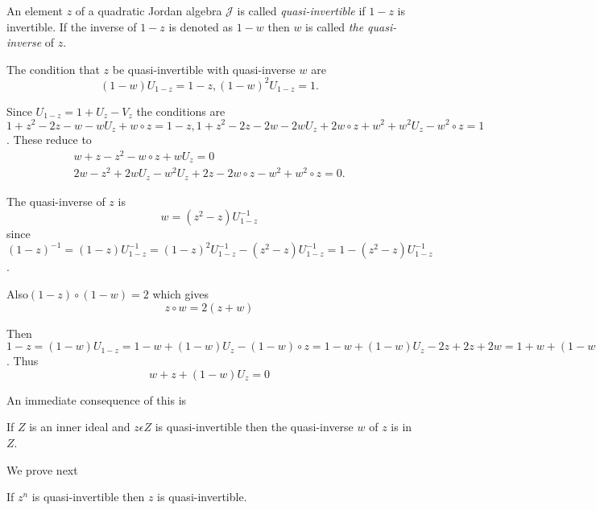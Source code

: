 \setcounter{defn}{0}
\begin{defn}\label{c3:defn1}
An element $z$ of a quadratic Jordan algebra $\mathscr{J}$ is called
{\em quasi-invertible} if $1-z$ is invertible. If the inverse of $1-z$
is denoted as $1-w$ then $w$ is called {\em the quasi-inverse} of $z$.

The condition that $z$ be quasi-invertible with quasi-inverse $w$ are
\begin{equation*}
(1-w)U_{1-z}=1-z,(1-w)^{2}U_{1-z}=1.\tag{1}\label{c3:eq1}
\end{equation*}

Since $U_{1-z}=1+U_z-V_z$ the conditions are $1+z^{2}-2z-w-wU_z+
w\circ z=1-z, 1+z^{2}-2z-2w-2w U_z+2w\circ z +
w^{2}+w^{2}U_z-w^{2}\circ z=1$. These reduce to
\begin{gather*}
  w+z-z^{2}-w\circ z+wU_z=0\tag{2}\label{c3:eq2}\\
  2w-z^{2}+2wU_z-w^{2}U_z+2z-2w\circ z-w^{2}+w^{2}\circ
  z=0.\tag{3}\label{c3:eq3} 
\end{gather*}

The quasi-inverse of $z$ is
\begin{equation*}
  w=(z^{2}-z)U^{-1}_{1-z}\tag{4}\label{c3:eq4}
\end{equation*}
since $(1-z)^{-1}=(1-z)U^{-1}_{1-z}=(1-z)^{2}U^{-1}_{1-z} - (z^{2}-z)
U^{-1}_{1-z} =1-(z^{2}-z)U^{-1}_{1-z}$. 
\end{defn}

Also\pageoriginale $(1-z)\circ(1-w)=2$ which gives
\begin{equation*}
  z\circ w=2(z+w)\tag{5}\label{c3:eq5}
\end{equation*}

Then $1-z=(1-w)U_{1-z}=1-w+(1-w)U_z-(1-w)\circ
z=1-w+(1-w)U_z-2z+2z+2w=1+w+(1-w)U_z$. Thus
\begin{equation*}
  w+z+(1-w)U_z=0\tag{6}\label{c3:eq6}
\end{equation*}

An immediate consequence of this is
\setcounter{lemma}{0}
\begin{lemma}\label{c3:lem1}
  If $Z$ is an inner ideal and $z\epsilon Z$ is
  quasi-invertible then the quasi-inverse $w$ of $z$ is in
$Z$.
\end{lemma}

We prove next
\begin{lemma}\label{c3:lem2}
  If $z^{n}$ is quasi-invertible then $z$ is quasi-invertible.
\end{lemma}

